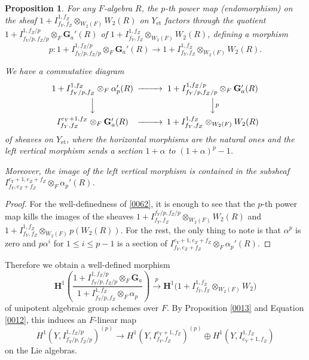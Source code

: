 \documentclass{amsart}
\newtheorem{Prop}[Thm]{Proposition}
\theoremstyle{remark}
\numberwithin{equation}{section}
\newcommand{\tensor}{\mathbin{\otimes}}
\newcommand{\et}{\mathrm{et}}
\newcommand{\Ga}{\mathbf{G}_{a}}
\newcommand{\alg}[1]{\mathbf{#1}}
\begin{document}
\begin{Prop}
	For any $F$-algebra $R$,
	the $p$-th power map (endomorphism) on the sheaf
	$1 + I^{1, f_{Z}}_{f_{Y}, f_{Z}} \tensor_{W_{2}(F)} W_{2}(R)$
	on $Y_{\et}$ factors through the quotient
	$1 + I^{1, f_{Z} / p}_{f_{Y} / p, f_{Z} / p} \tensor_{F} \Ga'(R)$
	of $1 + I^{1, f_{Z}}_{f_{Y}, f_{Z}} \tensor_{W_{2}(F)} W_{2}(R)$,
	defining a morphism
		\begin{equation} \label{0062}
				p
			\colon
				1 + I^{1, f_{Z} / p}_{f_{Y} / p, f_{Z} / p} \tensor_{F} \Ga'(R)
			\to
				1 + I^{1, f_{Z}}_{f_{Y}, f_{Z}} \tensor_{W_{2}(F)} W_{2}(R).
		\end{equation}
	
	We have a commutative diagram
		\[
			\begin{CD}
					1 + I^{1, f_{Z}}_{f_{Y} / p, f_{Z}} \tensor_{F} \alpha_{p}'(R)
				@>>>
					1 + I^{1, f_{Z} / p}_{f_{Y} / p, f_{Z} / p} \tensor_{F} \Ga'(R)
				\\
				@VVV @VV p V
				\\
					I^{e_{Y} + 1, f_{Z}}_{f_{Y}, f_{Z}} \tensor_{F} \Ga'(R)
				@>>>
					1 + I^{1, f_{Z}}_{f_{Y}, f_{Z}} \tensor_{W_{2}(F)} W_{2}(R)
			\end{CD}
		\]
	of sheaves on $Y_{\et}$,
	where the horizontal morphisms are the natural ones and
	the left vertical morphism sends a section $1 + \alpha$ to $(1 + \alpha)^{p} - 1$.
	
	Moreover, the image of the left vertical morphism is contained in the subsheaf
	$I^{e_{Y} + 1, e_{Z} + f_{Z}}_{f_{Y}, e_{Z} + f_{Z}} \tensor_{F} \alpha_{p}'(R)$.
\end{Prop}

\begin{proof}
	For the well-definedness of \eqref{0062},
	it is enough to see that the $p$-th power map kills the images of the sheaves
	$1 + I^{f_{Y} / p, f_{Z} / p}_{f_{Y}, f_{Z}} \tensor_{W_{2}(F)} W_{2}(R)$
	and
	$1 + I^{1, f_{Z}}_{f_{Y}, f_{Z}} \tensor_{W_{2}(F)} p (W_{2}(R))$.
	For the rest,
	the only thing to note is that $\alpha^{p}$ is zero
	and $p \alpha^{i}$ for $1 \le i \le p - 1$ is a section of
	$I^{e_{Y} + 1, e_{Z} + f_{Z}}_{f_{Y}, e_{Z} + f_{Z}} \tensor_{F} \alpha_{p}'(R)$.
\end{proof}

Therefore we obtain a well-defined morphism
	\begin{equation} \label{0015}
			\alg{H}^{1} \left(
				\frac{
					1 + I^{1, f_{Z} / p}_{f_{Y} / p, f_{Z} / p} \tensor_{F} \Ga
				}{
					1 + I^{1, f_{Z}}_{f_{Y} / p, f_{Z}} \tensor_{F} \alpha_{p}
				}
			\right)
		\stackrel{p}{\to}
			\alg{H}^{1} \bigl(
					1
				+
					I^{1, f_{Z}}_{f_{Y}, f_{Z}}
				\tensor_{W_{2}(F)}
					W_{2}
			\bigr)
	\end{equation}
of unipotent algebraic group schemes over $F$.
By Proposition \ref{0013} and Equation \eqref{0012},
this induces an $F$-linear map
	\begin{equation} \label{0014}
			H^{1}(Y, I^{1, f_{Z} / p}_{f_{Y} / p, f_{Z} / p})^{(p)}
		\to
				H^{1}(Y, I^{e_{Y} + 1, f_{Z}}_{f_{Y}, f_{Z}})^{(p)}
			\oplus
				H^{1}(Y, I^{1, f_{Z}}_{e_{Y} + 1, f_{Z}})
	\end{equation}
on the Lie algebras.
\end{document}
